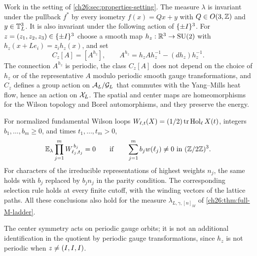 \begin{theorem}\label{ch26:thm:spatial-center-symmetry}
Work in the setting of \cref{ch26:sec:properties-setting}. The measure $\lambda$ is invariant under the pullback $f^*$ by every isometry $f(x)=Qx+y$ with $Q\in O(3,\mathbb Z)$ and $y\in\mathbb T_L^3$. It is also invariant under the following action of $\{\pm I\}^3$. For $z=(z_1,z_2,z_3)\in\{\pm I\}^3$ choose a smooth map $h_z:\mathbb R^3\to\mathrm{SU}(2)$ with $h_z(x+Le_i)=z_ih_z(x)$, and set
\[
 C_z[A]=[A^{h_z}],\qquad A^{h_z}=h_zAh_z^{-1}-(dh_z)h_z^{-1}.
\]
The connection $A^{h_z}$ is periodic, the class $C_z[A]$ does not depend on the choice of $h_z$ or of the representative $A$ modulo periodic smooth gauge transformations, and $C_z$ defines a group action on $\mathcal A_L/\mathcal G_L$ that commutes with the Yang--Mills heat flow, hence an action on $\mathcal X_L$. The spatial and center maps are homeomorphisms for the Wilson topology and Borel automorphisms, and they preserve the energy.

For normalized fundamental Wilson loops $W_{\ell,t}(X)=(1/2)\operatorname{tr}\operatorname{Hol}_\ell X(t)$, integers $b_1,\dots,b_m\ge0$, and times $t_1,\dots,t_m>0$,
\[
 \E_\lambda\prod_{j=1}^mW_{\ell_j,t_j}^{\,b_j}=0\qquad\text{if}\qquad\sum_{j=1}^mb_jw(\ell_j)\ne0\ \text{in }(\Z/2\Z)^3.
\]
For characters of the irreducible representations of highest weights $n_j$, the same holds with $b_j$ replaced by $b_jn_j$ in the parity condition. The corresponding selection rule holds at every finite cutoff, with the winding vectors of the lattice paths. All these conclusions also hold for the measure $\lambda_{L,\gamma,[n]_M}$ of \cref{ch26:thm:full-M-ladder}.
\end{theorem}

The center symmetry acts on periodic gauge orbits; it is not an additional identification in the quotient by periodic gauge transformations, since $h_z$ is not periodic when $z\ne(I,I,I)$.

